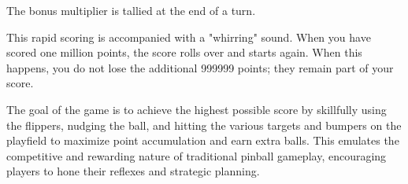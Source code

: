 The bonus multiplier is tallied at the end of a turn.

This rapid scoring is accompanied with a "whirring" sound. When you have scored one million points, the score rolls over and starts again. When this happens, you do not lose the additional 999999 points; they remain part of your score. \cite{atari_videopinball}

The goal of the game is to achieve the highest possible score by skillfully using the flippers, nudging the ball, and hitting the various targets and bumpers on the playfield to maximize point accumulation and earn extra balls. This emulates the competitive and rewarding nature of traditional pinball gameplay, encouraging players to hone their reflexes and strategic planning. \cite{atari_videopinball}


